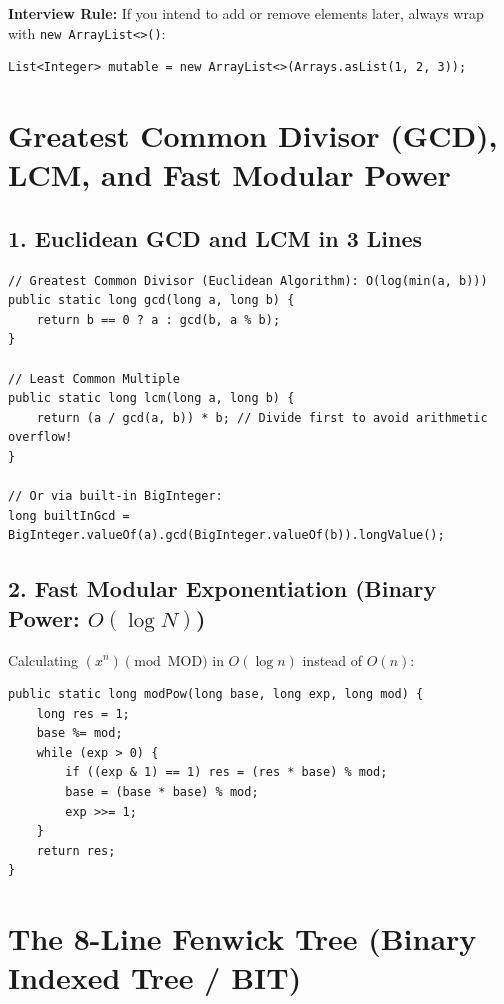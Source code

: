 \documentclass[10pt,journal,compsoc,onecolumn]{IEEEtran}
\begin{document}
\textbf{Interview Rule:} If you intend to add or remove elements later, always wrap with \texttt{new ArrayList<>()}:
\begin{verbatim}
List<Integer> mutable = new ArrayList<>(Arrays.asList(1, 2, 3));
\end{verbatim}

\section{Greatest Common Divisor (GCD), LCM, and Fast Modular Power}
\label{sec:math_primitives}

\subsection{1. Euclidean GCD and LCM in 3 Lines}
\begin{verbatim}
// Greatest Common Divisor (Euclidean Algorithm): O(log(min(a, b)))
public static long gcd(long a, long b) {
    return b == 0 ? a : gcd(b, a % b);
}

// Least Common Multiple
public static long lcm(long a, long b) {
    return (a / gcd(a, b)) * b; // Divide first to avoid arithmetic overflow!
}

// Or via built-in BigInteger:
long builtInGcd = BigInteger.valueOf(a).gcd(BigInteger.valueOf(b)).longValue();
\end{verbatim}

\subsection{2. Fast Modular Exponentiation (Binary Power: $O(\log N)$)}
Calculating $(x^n) \pmod{\text{MOD}}$ in $O(\log n)$ instead of $O(n)$:
\begin{verbatim}
public static long modPow(long base, long exp, long mod) {
    long res = 1;
    base %= mod;
    while (exp > 0) {
        if ((exp & 1) == 1) res = (res * base) % mod;
        base = (base * base) % mod;
        exp >>= 1;
    }
    return res;
}
\end{verbatim}

\section{The 8-Line Fenwick Tree (Binary Indexed Tree / BIT)}
\label{sec:fenwick}
\end{document}
